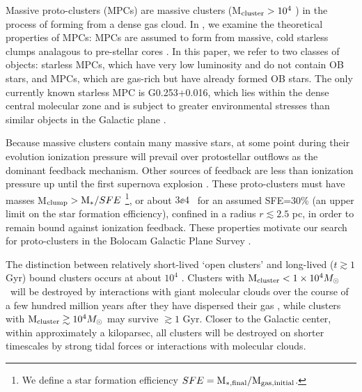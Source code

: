 
Massive proto-clusters (MPCs) are massive clusters (M$_{\rm cluster}>10^4$ \msun)
in the process of forming from a dense gas cloud.  In \citet{Bressert2012}, we
examine the theoretical properties of MPCs: MPCs are assumed to form from
massive, cold starless clumps analagous to pre-stellar cores
\citep{Williams2000}.  In this paper, we refer to two classes of objects:
starless MPCs, which have very low luminosity and do not contain OB stars, and
MPCs, which are gas-rich but have already formed OB stars.  The only
currently known starless MPC is G0.253+0.016, which lies within the dense
central molecular zone and is subject to greater environmental stresses than
similar objects in the Galactic plane \citep{Longmore2012}.

Because massive clusters contain many massive stars, at some point during their
evolution ionization pressure will prevail over protostellar outflows as the
dominant feedback mechanism.  Other sources of feedback are less than
ionization pressure up until the first supernova explosion
\citep{Bressert2012}.  These proto-clusters must have masses
M$_{\rm clump}>{\rm M}_{*}/SFE$ \footnote{We define a star formation efficiency
$SFE={\rm M}_{\rm *,final} / {\rm M}_{\rm gas,initial}$.}, or about $3\ee{4}$ \msun\ for an assumed
SFE=30\% (an upper limit on the star formation efficiency),
confined in a radius $r\lesssim2.5$ pc, in order to remain bound against
ionization feedback.  These properties motivate our search for proto-clusters
in the Bolocam Galactic Plane Survey \citep[BGPS;][
\url{http://irsa.ipac.caltech.edu/data/BOLOCAM_GPS/}]{Aguirre2011}.


The distinction between relatively short-lived `open clusters' and long-lived
($t\gtrsim1$ Gyr) bound clusters occurs at about $10^4$ \msun
\citep{PortegiesZwart2010}.  Clusters with ${\rm M}_{\rm cluster} < 1\times10^{4} M_{\odot}$~will
be destroyed by interactions with giant molecular clouds over the course of a
few hundred million years after they have dispersed their gas
\citep{Kruijssen2011}, while clusters with ${\rm M}_{\rm cluster}\gtrsim10^4 M_{\odot}$ may
survive $\gtrsim 1$ Gyr.  Closer to the Galactic center, within approximately a
kiloparsec, all clusters will be destroyed on shorter timescales by strong
tidal forces or interactions with molecular clouds.

